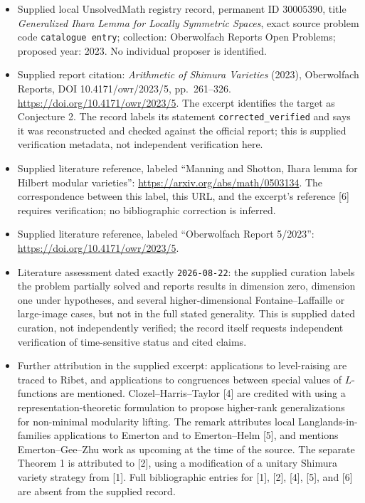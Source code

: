 \documentclass[11pt]{article}
\begin{document}
\begin{itemize}
\item Supplied local UnsolvedMath registry record, permanent ID \(30005390\), title \emph{Generalized Ihara Lemma for Locally Symmetric Spaces}, exact source problem code \texttt{catalogue entry}; collection: Oberwolfach Reports Open Problems; proposed year: 2023. No individual proposer is identified.
\item Supplied report citation: \emph{Arithmetic of Shimura Varieties} (2023), Oberwolfach Reports, DOI 10.4171/owr/2023/5, pp.~261--326. \url{https://doi.org/10.4171/owr/2023/5}. The excerpt identifies the target as Conjecture 2. The record labels its statement \texttt{corrected\_verified} and says it was reconstructed and checked against the official report; this is supplied verification metadata, not independent verification here.
\item Supplied literature reference, labeled ``Manning and Shotton, Ihara lemma for Hilbert modular varieties'': \url{https://arxiv.org/abs/math/0503134}. The correspondence between this label, this URL, and the excerpt's reference [6] requires verification; no bibliographic correction is inferred.
\item Supplied literature reference, labeled ``Oberwolfach Report 5/2023'': \url{https://doi.org/10.4171/owr/2023/5}.
\item Literature assessment dated exactly \texttt{2026-08-22}: the supplied curation labels the problem partially solved and reports results in dimension zero, dimension one under hypotheses, and several higher-dimensional Fontaine--Laffaille or large-image cases, but not in the full stated generality. This is supplied dated curation, not independently verified; the record itself requests independent verification of time-sensitive status and cited claims.
\item Further attribution in the supplied excerpt: applications to level-raising are traced to Ribet, and applications to congruences between special values of \(L\)-functions are mentioned. Clozel--Harris--Taylor [4] are credited with using a representation-theoretic formulation to propose higher-rank generalizations for non-minimal modularity lifting. The remark attributes local Langlands-in-families applications to Emerton and to Emerton--Helm [5], and mentions Emerton--Gee--Zhu work as upcoming at the time of the source. The separate Theorem 1 is attributed to [2], using a modification of a unitary Shimura variety strategy from [1]. Full bibliographic entries for [1], [2], [4], [5], and [6] are absent from the supplied record.
\end{itemize}
\end{document}
